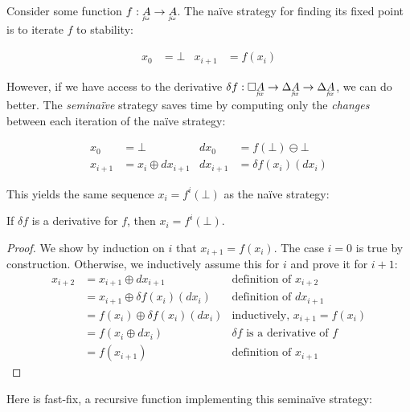 \documentclass{rntz}
\begin{document}
\newcommand\naive{na\"ive}

Consider some function $f : \fixtype{A} \to \fixtype{A}$. The \naive{} strategy
for finding its fixed point is to iterate $f$ to stability:

\begin{align*}
  x_0 &= \bot & x_{i+1} &= f(x_i)
\end{align*}

\noindent
However, if we have access to the derivative $\delta f : \Disc{\fixtype{A}} \to
\Ch\fixtype{A} \to \Ch\fixtype{A}$, we can do better. The \emph{semi\naive}
strategy saves time by computing only the \emph{changes} between each iteration
of the \naive{} strategy:

\begin{align*}
  x_0 &= \bot &
  dx_0 &= f(\bot) \ominus \bot\\
  x_{i+1} &= x_i \oplus dx_{i+1} &
  dx_{i+1} &= \delta f(x_i)(dx_i)
\end{align*}

\noindent This yields the same sequence $x_i = f^i(\bot)$ as the
\naive{} strategy:
\begin{theorem} If $\delta f$ is a derivative for $f$, then \(x_i = f^i(\bot)\).
\end{theorem}
\begin{proof}
  We show by induction on $i$ that $x_{i+1} = f(x_i)$. The case $i = 0$ is true
  by construction. Otherwise, we inductively assume this for $i$ and prove it
  for $i+1$:
  \begin{align*}
    x_{i+2}
    &= x_{i+1} \oplus dx_{i+1}
    & \text{definition of $x_{i+2}$}\\
    &= x_{i+1} \oplus \delta f(x_i)(dx_i) & \text{definition of $dx_{i+1}$}\\
    &= f(x_i) \oplus \delta f(x_i)(dx_i)
    & \text{inductively, $x_{i+1} = f(x_i)$}\\
    &= f(x_i \oplus dx_i) & \text{$\delta f$ is a derivative of $f$}\\
    &= f(x_{i+1}) & \text{definition of $x_{i+1}$}
  \end{align*}
\end{proof}

\noindent
Here is \textsf{fast-fix}, a recursive function implementing this semi\naive{}
strategy:
\end{document}
